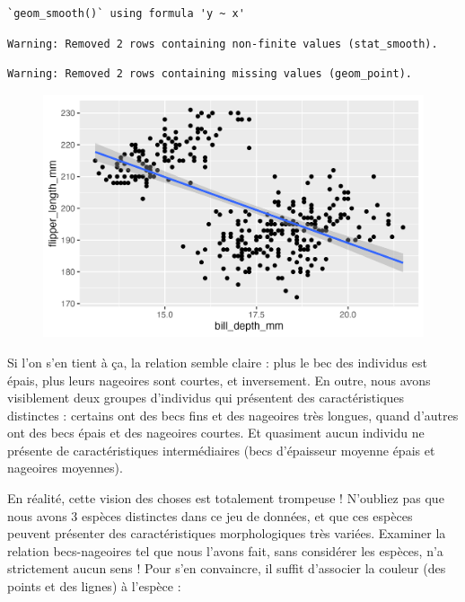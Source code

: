 \documentclass[
  letterpaper,
  DIV=11,
  numbers=noendperiod]{scrreprt}
\begin{document}
\begin{verbatim}
`geom_smooth()` using formula 'y ~ x'
\end{verbatim}

\begin{verbatim}
Warning: Removed 2 rows containing non-finite values (stat_smooth).
\end{verbatim}

\begin{verbatim}
Warning: Removed 2 rows containing missing values (geom_point).
\end{verbatim}

\begin{figure}[H]

{\centering \includegraphics{./03-visualization_files/figure-pdf/unnamed-chunk-82-1.png}

}

\end{figure}

Si l'on s'en tient à ça, la relation semble claire : plus le bec des
individus est épais, plus leurs nageoires sont courtes, et inversement.
En outre, nous avons visiblement deux groupes d'individus qui présentent
des caractéristiques distinctes : certains ont des becs fins et des
nageoires très longues, quand d'autres ont des becs épais et des
nageoires courtes. Et quasiment aucun individu ne présente de
caractéristiques intermédiaires (becs d'épaisseur moyenne épais et
nageoires moyennes).

En réalité, cette vision des choses est totalement trompeuse ! N'oubliez
pas que nous avons 3 espèces distinctes dans ce jeu de données, et que
ces espèces peuvent présenter des caractéristiques morphologiques très
variées. Examiner la relation becs-nageoires tel que nous l'avons fait,
sans considérer les espèces, n'a strictement aucun sens ! Pour s'en
convaincre, il suffit d'associer la couleur (des points et des lignes) à
l'espèce :
\end{document}
